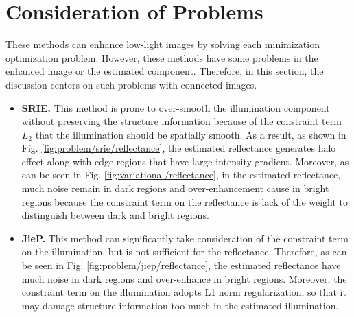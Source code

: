 \section{Consideration of Problems} \label{sec:problems}
These methods can enhance low-light images by solving each minimization optimization problem.
However, these methods have some problems in the enhanced image or the estimated component.
Therefore, in this section, the discussion centers on such problems with connected images.
\begin{itemize}
\item \textbf{SRIE.}
This method is prone to over-smooth the illumination component without preserving the structure information because of the constraint term $L_{2}$ that the illumination should be spatially smooth. 
As a result, as shown in Fig. \ref{fig:problem/srie/reflectance}, the estimated reflectance generates halo effect along with edge regions that have large intensity gradient. 
Moreover, as can be seen in Fig. \ref{fig:variational/reflectance}, in the estimated reflectance, much noise remain in dark regions and over-enhancement cause in bright regions because the constraint term on the reflectance is lack of the weight to distinguish between dark and bright regions.
\end{itemize}
\begin{itemize}
\item \textbf{JieP.}
This method can significantly take consideration of the constraint term on the illumination, but is not sufficient for the reflectance. Therefore, as can be seen in Fig. \ref{fig:problem/jiep/reflectance}, the estimated reflectance have much noise in dark regions and over-enhance in bright regions. Moreover, the constraint term on the illumination adopts L1 norm regularization, so that it may damage structure information too much in the estimated illumination.
\end{itemize}


